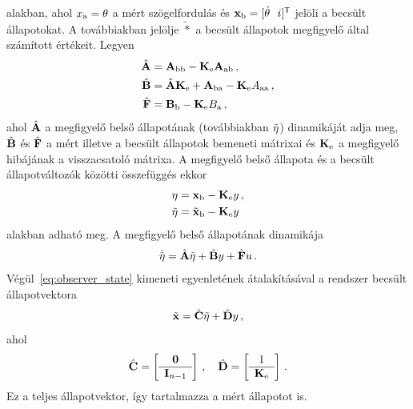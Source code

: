 alakban, ahol $x_{\mathrm{a}} = \theta$ a mért szögelfordulás és 
$\mathbf{x}_{\mathrm{b}} = [\dot \theta~~i]^{\mathsf T}$ jelöli a becsült állapotokat.
A továbbiakban jelölje $\tilde{*}$ a becsült állapotok megfigyelő által számított értékeit. Legyen
\begin{align}\label{eq:observer_params}
    \begin{split}
    \hat{\mathbf{A}} &= \mathbf{A}_{\mathrm{bb}} - \mathbf{K}_{\mathrm{e}} \mathbf{A}_{\mathrm{ab}}\,,\\
    \hat{\mathbf{B}} &= \hat{\mathbf{A}} \mathbf{K}_{\mathrm{e}} + \mathbf{A}_{\mathrm{ba}} - \mathbf{K}_{\mathrm{e}} A_{\mathrm{aa}}\,,\\
    \hat{\mathbf{F}} &= \mathbf{B}_{\mathrm{b}} - \mathbf{K}_{\mathrm{e}} B_{\mathrm{a}}\,,
    \end{split}
\end{align}
ahol $\hat{\mathbf{A}}$ a megfigyelő belső állapotának (továbbiakban $\tilde{\mathbf{\eta}}$) 
dinamikáját adja meg, $\hat{\mathbf{B}}$ és $\hat{\mathbf{F}}$ a mért illetve a becsült állapotok 
bemeneti mátrixai és $\mathbf{K}_{\mathrm{e}}$ a megfigyelő hibájának a visszacsatoló mátrixa. 
A megfigyelő belső állapota és a becsült állapotváltozók közötti összefüggés ekkor
\begin{align}
    \begin{split}
    \mathbf{\eta} &= \mathbf{x}_{\mathrm{b}} - \mathbf{K}_{\mathrm{e}} y\,,\\
    \tilde{\mathbf{\eta}} &= \tilde{\mathbf{x}}_{\mathrm{b}} - \mathbf{K}_{\mathrm{e}} y
    \end{split}
\end{align}
alakban adható meg. A megfigyelő belső állapotának dinamikája
\begin{align}
    \begin{split}
    \dot{\tilde{\mathbf{\eta}}} = \hat{\mathbf{A}} \tilde{\mathbf{\eta}} + \hat{\mathbf{B}} y + \hat{\mathbf{F}} u\,.
    \end{split}
\end{align}
Végül~\eqref{eq:observer_state} kimeneti egyenletének átalakításával a rendszer becsült állapotvektora
\begin{align}
    \tilde{\mathbf{x}} = \hat{\mathbf{C}} \tilde{\mathbf{\eta}} + \hat{\mathbf{D}} y\,,
\end{align}
ahol
\begin{align}
    \hat{\mathbf{C}} = 
    \left[\begin{array}{c}
        \mathbf{0} \\ \hline
        \mathbf{I}_{n-1}
    \end{array}\right]\,,
    \quad
    \hat{\mathbf{D}} = 
    \left[\begin{array}{c}
        1 \\ \hline
        \mathbf{K}_{\mathrm{e}}
    \end{array}\right]\,.
\end{align}
Ez a teljes állapotvektor, így tartalmazza a mért állapotot is.

